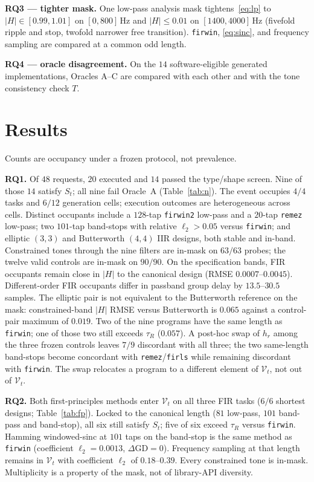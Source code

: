 \documentclass{article}
\begin{document}
\noindent\textbf{RQ3 --- tighter mask.}
One low-pass analysis mask tightens~\eqref{eq:lp} to
$\lvert H\rvert\in[0.99,1.01]$ on $[0,800]\,\mathrm{Hz}$ and
$\lvert H\rvert\le 0.01$ on $[1400,4000]\,\mathrm{Hz}$
(fivefold ripple and stop, twofold narrower free transition).
\texttt{firwin}, \eqref{eq:sinc}, and frequency sampling are compared
at a common odd length.

\noindent\textbf{RQ4 --- oracle disagreement.}
On the $14$ software-eligible generated implementations, Oracles A--C
are compared with each other and with the tone consistency check $T$.

\section{Results}
\label{sec:results}

Counts are occupancy under a frozen protocol, not prevalence.

\noindent\textbf{RQ1.}
Of $48$ requests, $20$ executed and $14$ passed the type/shape screen.
Nine of those $14$ satisfy $S_t$; all nine fail Oracle~A
(Table~\ref{tab:n}).
The event occupies $4/4$ tasks and $6/12$ generation cells;
execution outcomes are heterogeneous across cells.
Distinct occupants include a $128$-tap \texttt{firwin2} low-pass and a
$20$-tap \texttt{remez} low-pass; two $101$-tap band-stops with
relative $\ell_2>0.05$ versus \texttt{firwin}; and elliptic $(3,3)$
and Butterworth $(4,4)$ IIR designs, both stable and in-band.
Constrained tones through the nine filters are in-mask on $63/63$
probes; the twelve valid controls are in-mask on $90/90$.
On the specification bands, FIR occupants remain close in
$\lvert H\rvert$ to the canonical design (RMSE $0.0007$--$0.0045$).
Different-order FIR occupants differ in passband group delay by
$13.5$--$30.5$ samples.
The elliptic pair is not equivalent to the Butterworth reference on the mask:
constrained-band $\lvert H\rvert$ RMSE versus Butterworth is $0.065$
against a control-pair maximum of $0.019$.
Two of the nine programs have the same length as \texttt{firwin}; one
of those two still exceeds $\tau_R$ ($0.057$).
A post-hoc swap of $h_r$ among the three frozen controls leaves $7/9$
discordant with all three; the two same-length band-stops become
concordant with \texttt{remez}/\texttt{firls} while remaining
discordant with \texttt{firwin}.
The swap relocates a program to a different element of $\mathcal{V}_t$,
not out of $\mathcal{V}_t$.

\noindent\textbf{RQ2.}
Both first-principles methods enter $\mathcal{V}_t$ on all three FIR
tasks ($6/6$ shortest designs; Table~\ref{tab:fp}).
Locked to the canonical length ($81$ low-pass, $101$ band-pass and
band-stop), all six still satisfy $S_t$; five of six exceed
$\tau_R$ versus \texttt{firwin}.
Hamming windowed-sinc at $101$ taps on the band-stop is the same
method as \texttt{firwin} (coefficient $\ell_2=0.0013$,
$\Delta\mathrm{GD}=0$).
Frequency sampling at that length remains in $\mathcal{V}_t$ with
coefficient $\ell_2$ of $0.18$--$0.39$.
Every constrained tone is in-mask.
Multiplicity is a property of the mask, not of library-API diversity.
\end{document}
